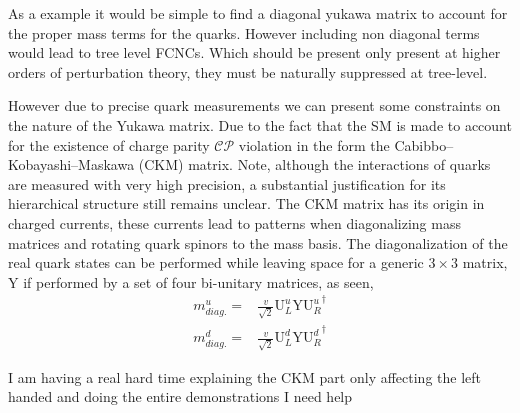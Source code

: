 As a example it would be simple to find a diagonal yukawa matrix to account for the proper mass terms for the quarks. However including non diagonal terms would lead to tree level FCNCs. Which should be present only present at higher orders of perturbation theory, they must be naturally suppressed at tree-level. 

However due to precise quark measurements we can present some constraints on the nature of the Yukawa matrix. Due to the fact that the SM is made to account for the existence of charge parity $\mathcal{CP}$ violation in the form the Cabibbo–Kobayashi–Maskawa (CKM) matrix. 
%
Note, although the interactions of quarks are measured with very high precision, a substantial justification for its hierarchical structure still remains unclear. 
%
The CKM matrix has its origin in charged currents, these currents lead to patterns when diagonalizing mass matrices and rotating quark spinors to the mass basis. 
%
The diagonalization of the real quark states can be performed while leaving space for a generic $3\times3$ matrix, $\mathrm{Y}$ if performed by a set of four bi-unitary matrices, as seen,
\begin{align}
m^u_{diag.}  =  & \frac{v}{\sqrt{2}} \mathrm{U}^u_L \mathrm{Y} {\mathrm{U}^u_R}^\dagger  \\
m^d_{diag.}  = & \frac{v}{\sqrt{2}}  \mathrm{U}^d_L \mathrm{Y} {\mathrm{U}^d_R}^\dagger 
\end{align}

{\color{red} I am having a real hard time explaining the CKM part only affecting the left handed and doing the entire demonstrations I need help}
  